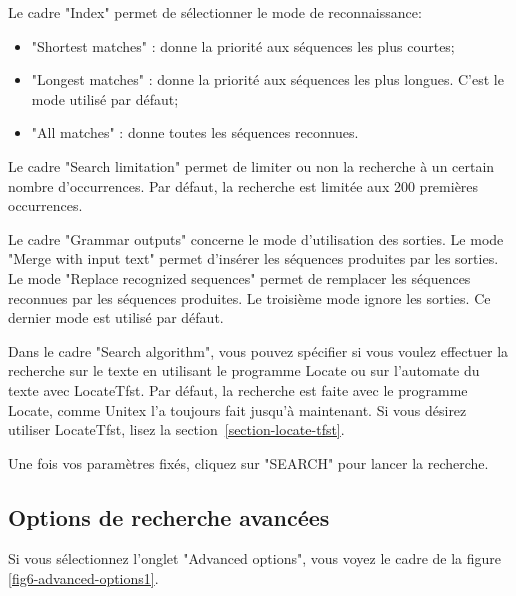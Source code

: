 \bigskip
\noindent Le cadre "Index" permet de sélectionner le mode de reconnaissance:

\begin{itemize}
  \item "Shortest matches" : donne la priorité aux séquences les plus courtes;
  \item "Longest matches" :  donne la priorité aux séquences les plus longues. C’est le mode
utilisé par défaut;
  \item "All matches" : donne toutes les séquences reconnues.
\end{itemize}

\noindent 
Le cadre "Search limitation" permet de limiter ou non la recherche à un certain nombre
d’occurrences. Par défaut, la recherche est limitée aux 200 premières occurrences.

\bigskip
{}
\noindent Le cadre "Grammar outputs" concerne le mode d’utilisation des sorties. Le mode "Merge
with input text" permet d’insérer les séquences produites par les sorties. Le mode "Replace
recognized sequences" permet de remplacer les séquences reconnues par les séquences produites.
Le troisième mode ignore les sorties. Ce dernier mode est utilisé par défaut.

\bigskip
\noindent
Dans le cadre "Search algorithm", vous pouvez spécifier si vous voulez effectuer la recherche sur le
texte en utilisant le programme Locate ou sur l'automate du texte avec LocateTfst.
Par défaut, la recherche est faite avec le programme Locate, comme Unitex l'a toujours fait jusqu'à
maintenant. Si vous désirez utiliser LocateTfst, lisez la section~\ref{section-locate-tfst}.

\bigskip
\noindent
Une fois vos paramètres fixés, cliquez sur "SEARCH" pour lancer la recherche.


\subsection{Options de recherche avancées}
\label{section-advanced-search-options}
Si vous sélectionnez l'onglet "Advanced options", vous voyez le cadre de la
figure \ref{fig6-advanced-options1}.

